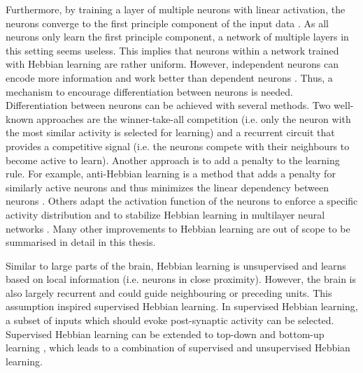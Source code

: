 Furthermore, by training a layer of multiple neurons with linear activation, the neurons converge to the first principle component of the input data \cite{Oja_1982}.
As all neurons only learn the first principle component, a network of multiple layers in this setting seems useless. This implies that neurons within a network trained with Hebbian learning are rather uniform.
However, independent neurons can encode more information and work better than dependent neurons .
Thus, a mechanism to encourage differentiation between neurons is needed.
Differentiation between neurons can be achieved with several methods.
Two well-known approaches are the winner-take-all competition (i.e. only the neuron with the most similar activity is selected for learning) and a recurrent circuit that provides a competitive signal (i.e. the neurons compete with their neighbours to become active to learn).
Another approach is to add a penalty to the learning rule.
For example, anti-Hebbian learning is a method that adds a penalty for similarly active neurons and thus minimizes the linear dependency between neurons .
Others adapt the activation function of the neurons to enforce a specific activity distribution and to stabilize Hebbian learning in multilayer neural networks .
Many other improvements to Hebbian learning are out of scope to be summarised in detail in this thesis.

Similar to large parts of the brain, Hebbian learning is unsupervised and learns based on local information (i.e. neurons in close proximity).
However, the brain is also largely recurrent and could guide neighbouring or preceding units.
This assumption inspired supervised Hebbian learning.
In supervised Hebbian learning, a subset of inputs which should evoke post-synaptic activity can be selected.
Supervised Hebbian learning can be extended to top-down and bottom-up learning , which leads to a combination of supervised and unsupervised Hebbian learning.











